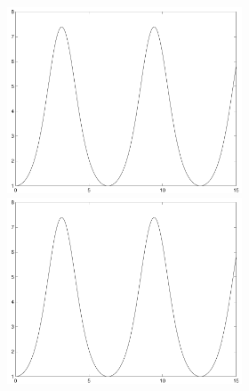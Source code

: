\documentclass{ximera}
\begin{document}
\begin{computerExercise}
\begin{solution}
\begin{figure}[htb]
     \centerline{%
     \includegraphics[width=2.75in]{exfigure/fig3_9a.pdf}
     \includegraphics[width=2.75in]{exfigure/fig3_9b.pdf}}
\end{figure} 




\end{solution}
\end{computerExercise}
\end{document}

